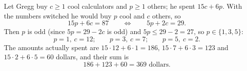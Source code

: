 Let Gregg buy $c\ge1$ cool calculators and $p\ge1$ others; he spent $15c+6p$. With the numbers switched he would buy $p$ cool and $c$ others, so
\[
15p+6c=87\qquad\Longleftrightarrow\qquad 5p+2c=29 .
\]
Then $p$ is odd (since $5p=29-2c$ is odd) and $5p\le29-2=27$, so $p\in\{1,3,5\}$:
\[
p=1,\ c=12;\qquad p=3,\ c=7;\qquad p=5,\ c=2 .
\]
The amounts actually spent are $15\cdot12+6\cdot1=186$, $15\cdot7+6\cdot3=123$ and $15\cdot2+6\cdot5=60$ dollars, and their sum is
\[
186+123+60=\boxed{369}\text{ dollars}.
\]
